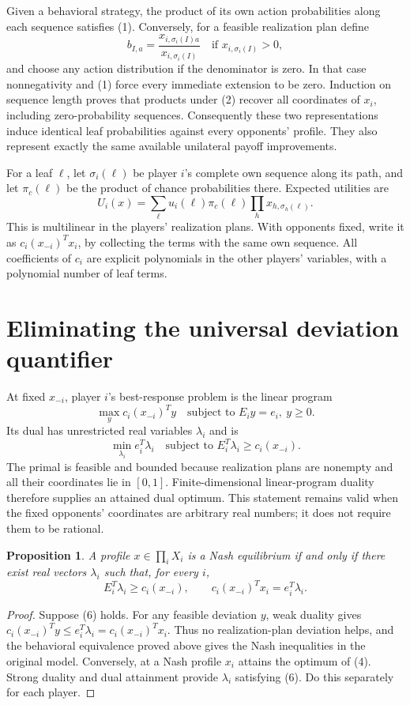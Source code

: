 \documentclass[11pt]{article}
\newtheorem{proposition}{Proposition}
\begin{document}
Given a behavioral strategy, the product of its own action probabilities
along each sequence satisfies (1). Conversely, for a feasible realization
plan define
\[
 b_{I,a}=\frac{x_{i,\sigma_i(I)a}}{x_{i,\sigma_i(I)}}
                          \quad\text{if }x_{i,\sigma_i(I)}>0,     \tag{2}
\]
and choose any action distribution if the denominator is zero. In that
case nonnegativity and (1) force every immediate extension to be zero.
Induction on sequence length proves that products under (2) recover all
coordinates of $x_i$, including zero-probability sequences. Consequently
these two representations induce identical leaf probabilities against
every opponents' profile. They also represent exactly the same available
unilateral payoff improvements.

For a leaf $\ell$, let $\sigma_i(\ell)$ be player $i$'s complete own
sequence along its path, and let $\pi_c(\ell)$ be the product of chance
probabilities there. Expected utilities are
\[
 U_i(x)=\sum_{\ell}u_i(\ell)\pi_c(\ell)
                            \prod_h x_{h,\sigma_h(\ell)}.         \tag{3}
\]
This is multilinear in the players' realization plans. With opponents
fixed, write it as $c_i(x_{-i})^Tx_i$, by collecting the terms with the
same own sequence. All coefficients of $c_i$ are explicit polynomials
in the other players' variables, with a polynomial number of leaf terms.

\section*{Eliminating the universal deviation quantifier}
At fixed $x_{-i}$, player $i$'s best-response problem is the linear program
\[
 \max_y c_i(x_{-i})^Ty
          \quad\text{subject to }E_iy=e_i,\ y\geq0.              \tag{4}
\]
Its dual has unrestricted real variables $\lambda_i$ and is
\[
 \min_{\lambda_i}e_i^T\lambda_i
          \quad\text{subject to }E_i^T\lambda_i\geq c_i(x_{-i}). \tag{5}
\]
The primal is feasible and bounded because realization plans are
nonempty and all their coordinates lie in $[0,1]$. Finite-dimensional
linear-program duality therefore supplies an attained dual optimum.
This statement remains valid when the fixed opponents' coordinates are
arbitrary real numbers; it does not require them to be rational.

\begin{proposition}
A profile $x\in\prod_iX_i$ is a Nash equilibrium if and only if there
exist real vectors $\lambda_i$ such that, for every $i$,
\[
 E_i^T\lambda_i\geq c_i(x_{-i}),\qquad
 c_i(x_{-i})^Tx_i=e_i^T\lambda_i.                                \tag{6}
\]
\end{proposition}
\begin{proof}
Suppose (6) holds. For any feasible deviation $y$, weak duality gives
$c_i(x_{-i})^Ty\leq e_i^T\lambda_i=c_i(x_{-i})^Tx_i$.
Thus no realization-plan deviation helps, and the behavioral equivalence
proved above gives the Nash inequalities in the original model.
Conversely, at a Nash profile $x_i$ attains the optimum of (4).
Strong duality and dual attainment provide $\lambda_i$ satisfying (6).
Do this separately for each player.
\end{proof}
\end{document}
